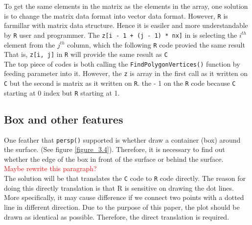 \documentclass[paper=a4, fontsize=11pt]{report}
\begin{document}
To get the same elements in the matrix as the elements in the array, one solution is to change the matrix data format into vector data format. However, \texttt{R} is farmillar with matrix data structure. Hence it is easiler and more understandable by \texttt{R} user and programmer. The \texttt{z[i - 1 + (j - 1) * nx]} in  is selecting the $i^{th}$ element from the $j^{th}$ column, which the following \texttt{R} code provied the same result That is, \texttt{z[i, j]} in \texttt{R} will provide the same result as \texttt{C} \\


The top piece of codes is both calling the \texttt{FindPolygonVertices()} function by feeding parameter into it. However, the \texttt{z} is array in the first call as it written on \texttt{C} but the second is matrix as it written on \texttt{R}. the - 1 on the \texttt{R} code because \texttt{C} starting at 0 index but \texttt{R} starting at 1.\\

\subsection{Box and other features}
One feather that \texttt{persp()} supported is whether draw a container (box) around the surface. (See figure \ref{figure_3.4}). Therefore, it is necessary to find out whether the edge of the box in front of the surface or behind the surface. \\ 
\textcolor{red}{Maybe rewrite this paragraph?} \\

The solution will be that translates the \texttt{C} code to \texttt{R} code directly. The reason for doing this directly translation is that R is sensitive on drawing the dot lines. More specifically, it may cause difference if we connect two points with a dotted line in different direction. Due to the purpose of this paper, the plot should be drawn as identical as possible. Therefore, the direct translation is required.\\
\end{document}
